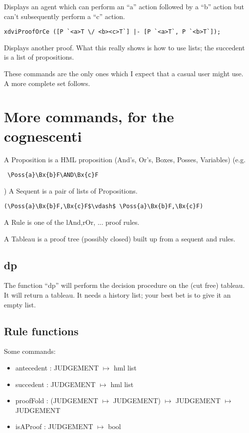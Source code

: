 \documentclass[12pt]{article}
\begin{document}
Displays an agent which can perform an ``a'' action followed by a ``b'' action
but can't subsequently perform a ``c'' action.

\begin{verbatim}
xdviProofOrCe ([P `<a>T \/ <b><c>T`] |- [P `<a>T`, P `<b>T`]);
\end{verbatim}

Displays another proof.  What this really shows is how to use
lists; the succedent is a list of propositions.

These commands are the only ones which I expect that a casual user
might use.  A more complete set follows.

\section{More commands, for the cognescenti}
A Proposition is a HML proposition (And's, Or's, Boxes, Posses, Variables)
(e.g. \begin{verbatim} \Poss{a}\Bx{b}F\AND\Bx{c}F \end{verbatim})
A Sequent is a pair of lists of Propositions.

\begin{verbatim}
(\Poss{a}\Bx{b}F,\Bx{c}F$\vdash$ \Poss{a}\Bx{b}F,\Bx{c}F)
\end{verbatim}

A Rule is one of the lAnd,rOr, ... proof rules.

A Tableau is a proof tree (possibly closed) built
up from a sequent and rules.

\subsection{dp}
The function ``dp'' will perform the decision procedure
on the (cut free) tableau.  It will return a tableau.
It needs a history list; your best bet is to give it an empty list.


\subsection{Rule functions}
Some commands:
\begin{itemize}
\item antecedent : JUDGEMENT $\mapsto$ hml list
\item succedent : JUDGEMENT $\mapsto$ hml list
\item proofFold : (JUDGEMENT $\mapsto$ JUDGEMENT) $\mapsto$ JUDGEMENT $\mapsto$ JUDGEMENT
\item isAProof : JUDGEMENT $\mapsto$ bool
\end{itemize}
\end{document}
